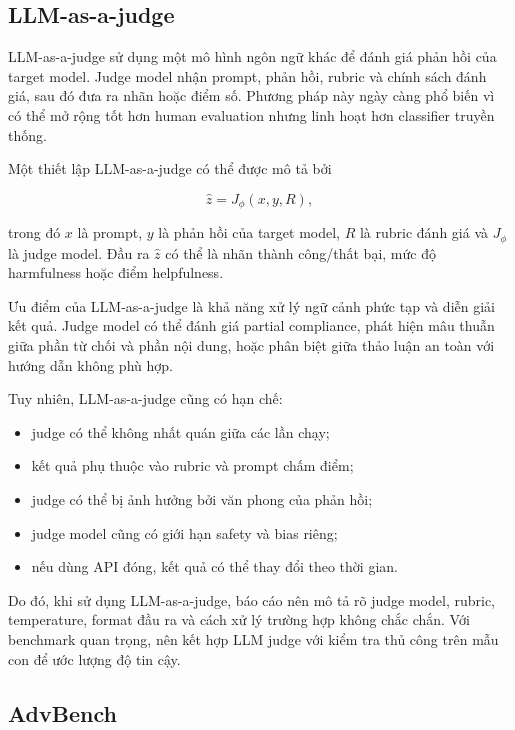 \subsection{LLM-as-a-judge}
\label{subsec:llm-as-a-judge}

LLM-as-a-judge sử dụng một mô hình ngôn ngữ khác để đánh giá phản hồi của
target model. Judge model nhận prompt, phản hồi, rubric và chính sách đánh
giá, sau đó đưa ra nhãn hoặc điểm số. Phương pháp này ngày càng phổ biến
vì có thể mở rộng tốt hơn human evaluation nhưng linh hoạt hơn classifier
truyền thống.

Một thiết lập LLM-as-a-judge có thể được mô tả bởi

\begin{equation}
    \hat{z}
    =
    J_{\phi}(x, y, R),
    \label{eq:llm-as-judge}
\end{equation}

trong đó $x$ là prompt, $y$ là phản hồi của target model, $R$ là rubric
đánh giá và $J_{\phi}$ là judge model. Đầu ra $\hat{z}$ có thể là nhãn
thành công/thất bại, mức độ harmfulness hoặc điểm helpfulness.

Ưu điểm của LLM-as-a-judge là khả năng xử lý ngữ cảnh phức tạp và diễn
giải kết quả. Judge model có thể đánh giá partial compliance, phát hiện
mâu thuẫn giữa phần từ chối và phần nội dung, hoặc phân biệt giữa thảo
luận an toàn với hướng dẫn không phù hợp.

Tuy nhiên, LLM-as-a-judge cũng có hạn chế:

\begin{itemize}[leftmargin=1.2cm]
    \item judge có thể không nhất quán giữa các lần chạy;
    \item kết quả phụ thuộc vào rubric và prompt chấm điểm;
    \item judge có thể bị ảnh hưởng bởi văn phong của phản hồi;
    \item judge model cũng có giới hạn safety và bias riêng;
    \item nếu dùng API đóng, kết quả có thể thay đổi theo thời gian.
\end{itemize}

Do đó, khi sử dụng LLM-as-a-judge, báo cáo nên mô tả rõ judge model, rubric,
temperature, format đầu ra và cách xử lý trường hợp không chắc chắn. Với
benchmark quan trọng, nên kết hợp LLM judge với kiểm tra thủ công trên mẫu
con để ước lượng độ tin cậy.

\subsection{AdvBench}
\label{subsec:advbench}

